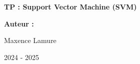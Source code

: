 \begin{titlepage}
    \vspace*{1cm}
    
        \begin{center}
         
            \Huge
    
    \hrulefill
            
            \textbf{TP : Support Vector Machine (SVM)}
    
    \hrulefill
                
                        
            \vspace{2cm}
    
            \Large
            \begin{minipage}[t]{0.4\textwidth}
                 \textbf{Auteur :}
            \end{minipage}
            \hfill
            \begin{minipage}[t]{0.45\textwidth}
                \raggedleft
                Maxence Lamure
            \end{minipage}
                
                
            \vspace{3cm}
            \large
            2024 - 2025
                
        \end{center}
    \end{titlepage}